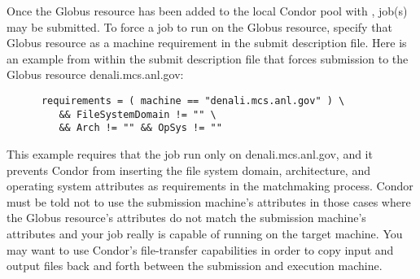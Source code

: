 Once the Globus resource has been added to the local Condor
pool with ,
job(s) may be submitted.
To force a job to run on the Globus resource,
specify that Globus resource as a machine requirement
in the submit description file. 
Here is an example from within the submit description file
that forces submission to the Globus resource denali.mcs.anl.gov:
\begin{verbatim}
      requirements = ( machine == "denali.mcs.anl.gov" ) \
         && FileSystemDomain != "" \
         && Arch != "" && OpSys != ""
\end{verbatim}
This example requires that the job run only on denali.mcs.anl.gov,
and it prevents Condor from inserting the file system domain,
architecture, and operating system attributes as requirements
in the matchmaking process.
Condor must be told not to use the submission machine's
attributes in those cases
where the Globus resource's attributes
do not match the submission machine's attributes and your job
really is capable of running on the target machine.  You
may want to use Condor's file-transfer capabilities in order
to copy input and output files back and forth between the submission
and execution machine.
